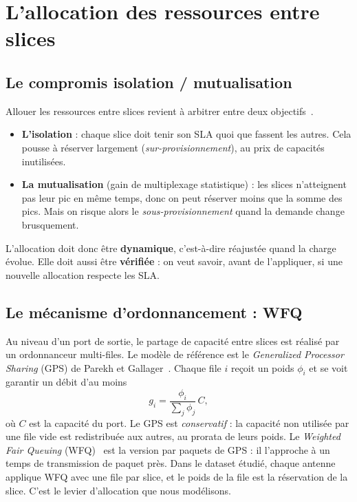 \section{L'allocation des ressources entre slices}\label{sec:sota-alloc}
\subsection{Le compromis isolation / mutualisation}
Allouer les ressources entre slices revient à arbitrer entre deux objectifs~\cite{foukas,afolabi}.
\begin{itemize}
  \item \textbf{L'isolation} : chaque slice doit tenir son SLA quoi que fassent les autres. Cela pousse à réserver largement (\emph{sur-provisionnement}), au prix de capacités inutilisées.
  \item \textbf{La mutualisation} (gain de multiplexage statistique) : les slices n'atteignent pas leur pic en même temps, donc on peut réserver moins que la somme des pics. Mais on risque alors le \emph{sous-provisionnement} quand la demande change brusquement.
\end{itemize}
L'allocation doit donc être \textbf{dynamique}, c'est-à-dire réajustée quand la charge évolue. Elle doit aussi être \textbf{vérifiée} : on veut savoir, avant de l'appliquer, si une nouvelle allocation respecte les SLA.

\subsection{Le mécanisme d'ordonnancement : WFQ}
Au niveau d'un port de sortie, le partage de capacité entre slices est réalisé par un ordonnanceur multi-files. Le modèle de référence est le \emph{Generalized Processor Sharing} (GPS) de Parekh et Gallager~\cite{gps}. Chaque file $i$ reçoit un poids $\phi_i$ et se voit garantir un débit d'au moins
\begin{equation}
g_i=\frac{\phi_i}{\sum_j \phi_j}\,C,
\end{equation}
où $C$ est la capacité du port. Le GPS est \emph{conservatif} : la capacité non utilisée par une file vide est redistribuée aux autres, au prorata de leurs poids. Le \emph{Weighted Fair Queuing} (WFQ)~\cite{wfq} est la version par paquets de GPS : il l'approche à un temps de transmission de paquet près. Dans le dataset étudié, chaque antenne applique WFQ avec une file par slice, et le poids de la file est la réservation de la slice. C'est le levier d'allocation que nous modélisons.

